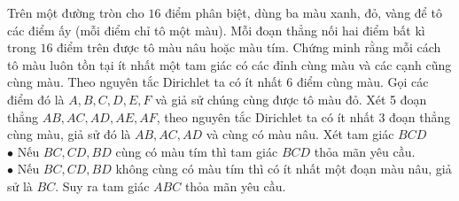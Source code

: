 \begin{ex}%
Trên một đường tròn cho $16$ điểm phân biệt, dùng ba màu xanh, đỏ, vàng để tô các điểm ấy (mỗi điểm chỉ tô một màu). Mỗi đoạn thẳng nối hai điểm bất kì trong $16$ điểm trên được tô màu nâu hoặc màu tím. Chứng minh rằng mỗi cách tô màu luôn tồn tại ít nhất một tam giác có các đỉnh cùng màu và các cạnh cũng cùng màu.
\loigiai
    {Theo nguyên tắc Dirichlet ta có ít nhất 6 điểm cùng màu. Gọi các điểm đó là $A,B,C,D,E,F$ và giả sử chúng cùng được tô màu đỏ. Xét 5 đoạn thẳng $AB, AC, AD, AE, AF$, theo nguyên tắc Dirichlet ta có ít nhất 3 đoạn thẳng cùng màu, giả sử đó là $AB, AC, AD$ và cùng có màu nâu. Xét tam giác $BCD$\\
    $\bullet$ Nếu $BC, CD, BD$ cùng có màu tím thì tam giác $BCD$ thỏa mãn yêu cầu.\\
    $\bullet$ Nếu $BC, CD, BD$ không cùng có màu tím thì có ít nhất một đoạn màu nâu, giả sử là $BC$. Suy ra tam giác $ABC$ thỏa mãn yêu cầu.
      }
\end{ex}

